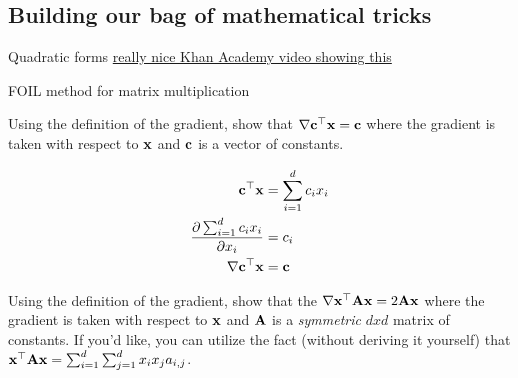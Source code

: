 \documentclass[assignment01_Solutions]{subfiles}
\begin{document}
\subsection{Building our bag of mathematical tricks}

\begin{exercise}[30 minutes]
\bes
\item Quadratic forms \href{https://www.khanacademy.org/math/multivariable-calculus/applications-of-multivariable-derivatives/quadratic-approximations/v/expressing-a-quadratic-form-with-a-matrix}{really nice Khan Academy video showing this}
\item FOIL method for matrix multiplication

\item Using the definition of the gradient, show that $\nabla \mathbf{c}^\top \mathbf{x} = \mathbf{c}$ where the gradient is taken with respect to $\mathbf{x}$ and $\mathbf{c}$ is a vector of constants.


\begin{boxedsolution}

\begin{align}
\mathbf{c}^\top \mathbf{x} &= \sum_{i=1}^d c_i x_i \\
\frac{\partial  \sum_{i=1}^d c_i x_i }{\partial x_i} &= c_i  \\
\nabla \mathbf{c}^\top \mathbf{x} &= \mathbf{c}
\end{align}

\end{boxedsolution}

\fi


\item Using the definition of the gradient, show that the $\nabla \mathbf{x}^\top \mathbf{A} \mathbf{x} = 2 \mathbf{A} \mathbf{x}$ where the gradient is taken with respect to $\mathbf{x}$ and $\mathbf{A}$ is a \emph{symmetric} $dxd$ matrix of constants.  If you'd like, you can utilize the fact (without deriving it yourself) that $\mathbf{x}^\top \mathbf{A} \mathbf{x} = \sum_{i=1}^d\sum_{j=1}^d x_i x_j a_{i, j}$.%
\ees

\begin{boxedsolution}


\end{boxedsolution}
\end{exercise}
\end{document}
